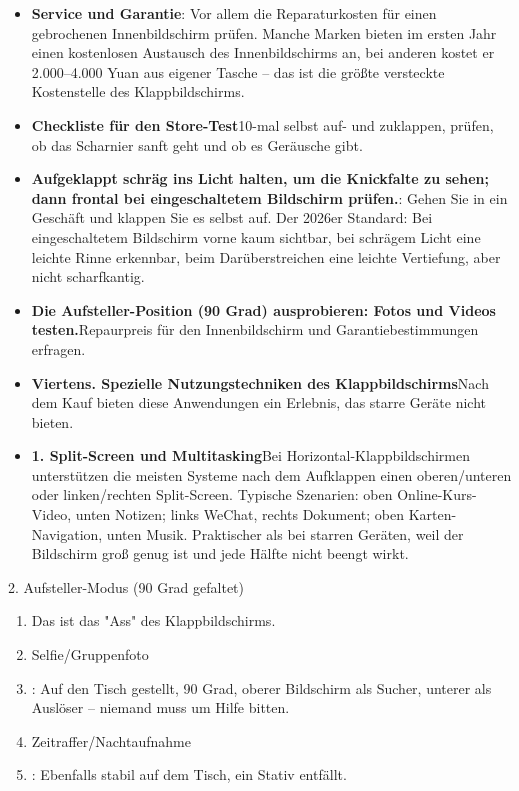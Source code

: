 \begin{itemize}
  \item \textbf{Service und Garantie}: Vor allem die Reparaturkosten für einen gebrochenen Innenbildschirm prüfen. Manche Marken bieten im ersten Jahr einen kostenlosen Austausch des Innenbildschirms an, bei anderen kostet er 2.000–4.000 Yuan aus eigener Tasche – das ist die größte versteckte Kostenstelle des Klappbildschirms.
  \item \textbf{Checkliste für den Store-Test}10-mal selbst auf- und zuklappen, prüfen, ob das Scharnier sanft geht und ob es Geräusche gibt.
  \item \textbf{Aufgeklappt schräg ins Licht halten, um die Knickfalte zu sehen; dann frontal bei eingeschaltetem Bildschirm prüfen.}: Gehen Sie in ein Geschäft und klappen Sie es selbst auf. Der 2026er Standard: Bei eingeschaltetem Bildschirm vorne kaum sichtbar, bei schrägem Licht eine leichte Rinne erkennbar, beim Darüberstreichen eine leichte Vertiefung, aber nicht scharfkantig.
  \item \textbf{Die Aufsteller-Position (90 Grad) ausprobieren: Fotos und Videos testen.}Repaurpreis für den Innenbildschirm und Garantiebestimmungen erfragen.
  \item \textbf{Viertens. Spezielle Nutzungstechniken des Klappbildschirms}Nach dem Kauf bieten diese Anwendungen ein Erlebnis, das starre Geräte nicht bieten.
  \item \textbf{1. Split-Screen und Multitasking}Bei Horizontal-Klappbildschirmen unterstützen die meisten Systeme nach dem Aufklappen einen oberen/unteren oder linken/rechten Split-Screen. Typische Szenarien: oben Online-Kurs-Video, unten Notizen; links WeChat, rechts Dokument; oben Karten-Navigation, unten Musik. Praktischer als bei starren Geräten, weil der Bildschirm groß genug ist und jede Hälfte nicht beengt wirkt.
\end{itemize}

\begin{tcbpractice}{2. Aufsteller-Modus (90 Grad gefaltet)}
\begin{enumerate}
  \item Das ist das "Ass" des Klappbildschirms.
  \item Selfie/Gruppenfoto
  \item : Auf den Tisch gestellt, 90 Grad, oberer Bildschirm als Sucher, unterer als Auslöser – niemand muss um Hilfe bitten.
  \item Zeitraffer/Nachtaufnahme
  \item : Ebenfalls stabil auf dem Tisch, ein Stativ entfällt.
\end{enumerate}

\end{tcbpractice}

